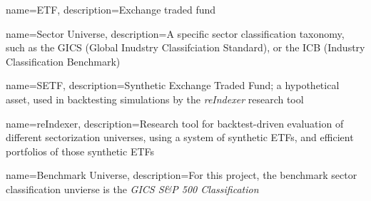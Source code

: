 \makeglossaries



{
    name=ETF,
    description={Exchange traded fund}
}


{
    name=Sector Universe,
    description={A specific sector classification taxonomy, such as the GICS (Global Inudstry Classifciation Standard), or the ICB (Industry Classification Benchmark)}
}

{
    name=SETF,
    description={Synthetic Exchange Traded Fund; a hypothetical asset, used in backtesting simulations by the \textit{reIndexer} research tool}
}

{
    name=reIndexer,
    description={Research tool for backtest-driven evaluation of different sectorization universes, using a system of synthetic ETFs, and efficient portfolios of those synthetic ETFs}
}

{
    name=Benchmark Universe,
    description={For this project, the benchmark sector classification unvierse is the \textit{GICS S\&P 500 Classification}}
}